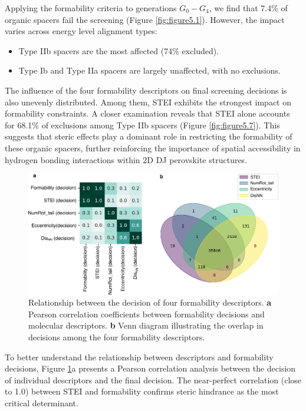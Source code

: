 Applying the formability criteria to generations $G_0-G_4$, we find that 7.4\% of organic spacers fail the screening (Figure \ref{fig:figure5.1}). However, the impact varies across energy level alignment types:
\begin{itemize}
    \item Type IIb spacers are the most affected (74\% excluded).
    \item Type Ib and Type IIa spacers are largely unaffected, with no exclusions.
\end{itemize}

The influence of the four formability descriptors on final screening decisions is also unevenly distributed. Among them, STEI exhibits the strongest impact on formability constraints. A closer examination reveals that STEI alone accounts for 68.1\% of exclusions among Type IIb spacers (Figure \ref{fig:figure5.7}). This suggests that steric effects play a dominant role in restricting the formability of these organic spacers, further reinforcing the importance of spatial accessibility in hydrogen bonding interactions within 2D DJ perovskite structures.

\begin{figure}[htbp]
    \centering
    \includegraphics[width=\textwidth]{figures/synthesis-feasibility/figure5-8.pdf}
    \caption[Relationship between the decision of four formability descriptors.]{Relationship between the decision of four formability descriptors. \textbf{a} Pearson correlation coefficients between formability decisions and molecular descriptors. \textbf{b} Venn diagram illustrating the overlap in decisions among the four formability descriptors.}
    \label{fig:figure5.8}
\end{figure}

To better understand the relationship between descriptors and formability decisions, Figure \ref{fig:figure5.8}a presents a Pearson correlation analysis between the decision of individual descriptors and the final decision. The near-perfect correlation (close to 1.0) between STEI and formability confirms steric hindrance as the most critical determinant.

